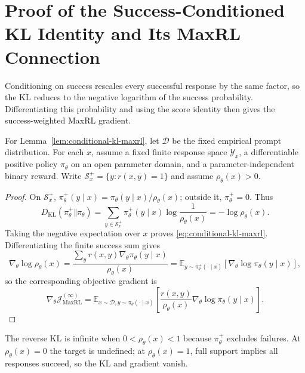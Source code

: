 \section{Proof of the Success-Conditioned KL Identity and Its MaxRL Connection}
\label{app:conditional-kl-maxrl}

\begin{insight}
Conditioning on success rescales every successful response by the same
factor, so the KL reduces to the negative logarithm of the success probability.
Differentiating this probability and using the score identity then gives
the success-weighted MaxRL gradient.
\end{insight}

For Lemma~\ref{lem:conditional-kl-maxrl}, let $\mathcal D$ be the fixed
empirical prompt distribution. For each $x$, assume a fixed finite
response space $\mathcal Y_x$, a differentiable positive policy
$\pi_\theta$ on an open parameter domain, and a parameter-independent
binary reward. Write $\mathcal S_x^+=\{y:r(x,y)=1\}$ and assume
$\rho_\theta(x)>0$.

\begin{proof}
On $\mathcal S_x^+$, $\pi_\theta^+(y\mid x)=\pi_\theta(y\mid x)/\rho_\theta(x)$;
outside it, $\pi_\theta^+=0$. Thus
\begin{equation}
 D_{\mathrm{KL}}(\pi_\theta^+\Vert\pi_\theta)
 =\sum_{y\in\mathcal S_x^+}\pi_\theta^+(y\mid x)
       \log\frac1{\rho_\theta(x)}
 =-\log\rho_\theta(x).
 \label{eq:app-success-kl}
\end{equation}
Taking the negative expectation over $x$ proves
\eqref{eq:conditional-kl-maxrl}. Differentiating the finite success sum gives
\begin{equation}
 \nabla_\theta\log\rho_\theta(x)
 =\frac{\sum_y r(x,y)\nabla_\theta\pi_\theta(y\mid x)}{\rho_\theta(x)}
 =\mathbb E_{y\sim\pi_\theta^+(\cdot\mid x)}
       [\nabla_\theta\log\pi_\theta(y\mid x)],
 \label{eq:app-success-score}
\end{equation}
so the corresponding objective gradient is
\begin{equation}
 \nabla_\theta\mathcal J_{\mathrm{MaxRL}}^{(\infty)}
 =\mathbb E_{x\sim\mathcal D,y\sim\pi_\theta(\cdot\mid x)}
 \left[\frac{r(x,y)}{\rho_\theta(x)}
              \nabla_\theta\log\pi_\theta(y\mid x)\right].
 \label{eq:maxrl-gradient}
\end{equation}
\end{proof}

The reverse KL is infinite when $0<\rho_\theta(x)<1$ because
$\pi_\theta^+$ excludes failures. At $\rho_\theta(x)=0$ the target is
undefined; at $\rho_\theta(x)=1$, full support implies all responses
succeed, so the KL and gradient vanish.


